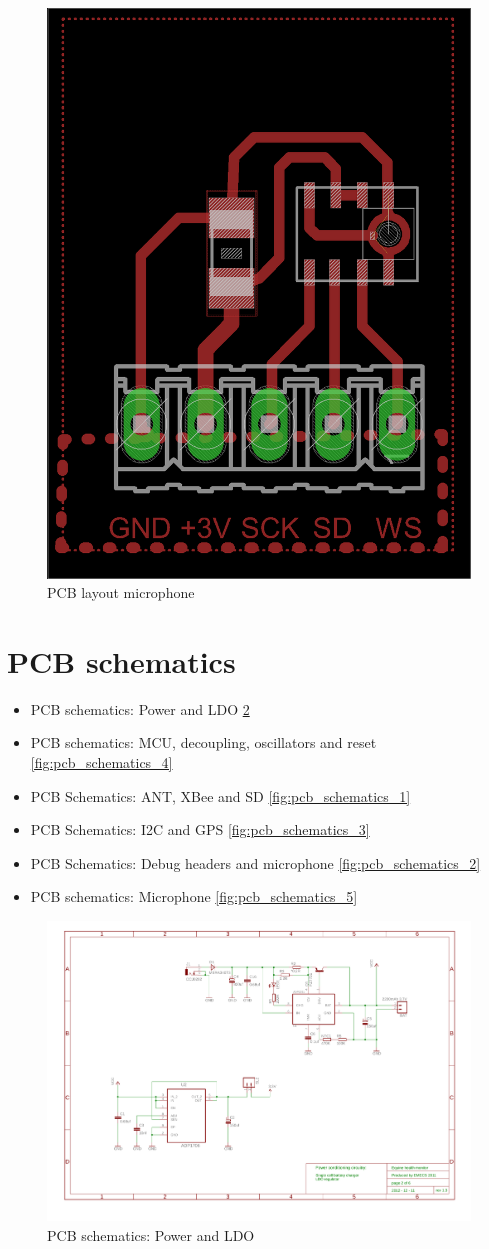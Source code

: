 \begin{figure}[htb]
\centering
\includegraphics[width=0.4\columnwidth]{Images/pcb_layout_mic}
\caption{PCB layout microphone}
\label{fig:pcb_layout_mic}
\end{figure}

\clearpage

\section{PCB schematics}
\label{sec:pcb_schematics}
\begin{itemize}
\item PCB schematics: Power and LDO \ref{fig:pcb_schematics_6}
\item PCB schematics: MCU, decoupling, oscillators and reset \ref{fig:pcb_schematics_4}
\item PCB Schematics: ANT, XBee and SD \ref{fig:pcb_schematics_1}
\item PCB Schematics: I2C and GPS \ref{fig:pcb_schematics_3}
\item PCB Schematics: Debug headers and microphone \ref{fig:pcb_schematics_2}
\item PCB schematics: Microphone \ref{fig:pcb_schematics_5}
\end{itemize}


\begin{figure}[htb]
\centering
\includegraphics[width=\columnwidth]{Images/pcb_power_ldo}
\caption{PCB schematics: Power and LDO}
\label{fig:pcb_schematics_6}
\end{figure}

